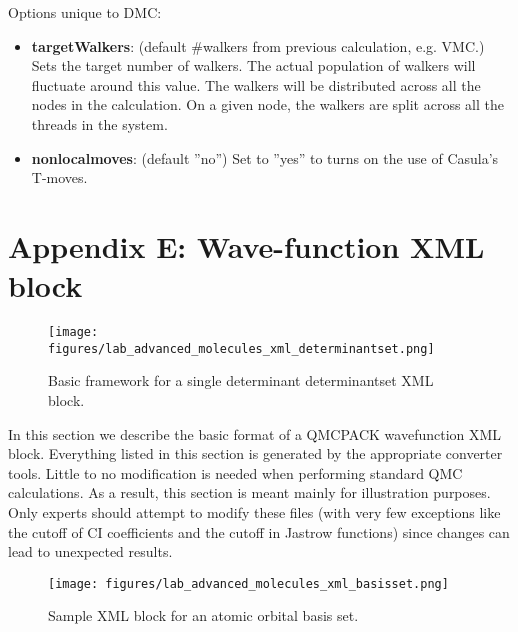 Options unique to DMC:
\begin{itemize}
\item{\textbf{targetWalkers}: (default \#walkers from previous calculation, e.g. VMC.) Sets the
target number of walkers. The actual population of walkers will fluctuate around this
value. The walkers will be distributed across all the nodes in the calculation. On a
given node, the walkers are split across all the threads in the system.}
\item{\textbf{nonlocalmoves}: (default ”no”) Set to ”yes” to turns on the use of Casula’s T-moves.}
\end{itemize}


\newpage
\section{Appendix E: Wave-function XML block}

\begin{figure}[ht!]
\begin{center}
\texttt{[image: figures/lab\_advanced\_molecules\_xml\_determinantset.png]}
\end{center}
\caption{Basic framework for a single determinant determinantset XML block.
\label{fig:lam_xml_determinantset}
}
\end{figure}

In this section we describe the basic format of a QMCPACK wavefunction XML block.
Everything listed in this section is generated by the appropriate converter tools. Little to
no modification is needed when performing standard QMC calculations. As a result, this
section is meant mainly for illustration purposes. Only experts should attempt to modify
these files (with very few exceptions like the cutoff of CI coefficients and the cutoff in Jastrow
functions) since changes can lead to unexpected results.

\begin{figure}[ht!]
\begin{center}
\texttt{[image: figures/lab\_advanced\_molecules\_xml\_basisset.png]}
\end{center}
\caption{Sample XML block for an atomic orbital basis set.
\label{fig:lam_xml_basisset}
}
\end{figure}


